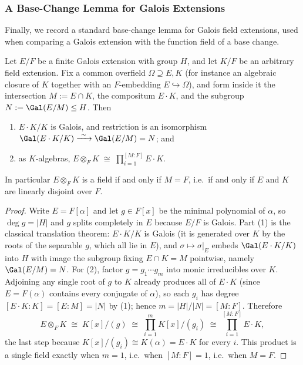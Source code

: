 \subsubsection*{A Base-Change Lemma for Galois Extensions}

Finally, we record a standard base-change lemma for Galois field extensions, used when
comparing a Galois extension with the function field of a base change.

\begin{lemma}\label{lem:galois-base-change}
Let $E/F$ be a finite Galois extension with group $H$, and let $K/F$ be an arbitrary
field extension. Fix a common overfield $\Omega \supseteq E,K$ (for instance an algebraic
closure of $K$ together with an $F$-embedding $E \hookrightarrow \Omega$), and form inside
it the intersection $M := E \cap K$, the compositum $E\cdot K$, and the subgroup
$N := \Gal(E/M) \leq H$. Then
\begin{enumerate}
  \item $E\cdot K / K$ is Galois, and restriction is an isomorphism
        $\Gal(E\cdot K/K) \xrightarrow{\ \sim\ } \Gal(E/M) = N$; and
  \item as $K$-algebras,
        $\displaystyle E \otimes_F K \;\cong\; \prod_{i=1}^{[M:F]} E\cdot K$.
\end{enumerate}
In particular $E\otimes_F K$ is a field if and only if $M = F$, i.e.\ if and only if $E$ and
$K$ are linearly disjoint over $F$.
\end{lemma}

\begin{proof}
Write $E = F[\alpha]$ and let $g \in F[x]$ be the minimal polynomial of $\alpha$, so
$\deg g = |H|$ and $g$ splits completely in $E$ because $E/F$ is Galois. Part (1) is the
classical translation theorem: $E\cdot K/K$ is Galois (it is generated over $K$ by the
roots of the separable $g$, which all lie in $E$), and $\sigma \mapsto \sigma|_E$ embeds
$\Gal(E\cdot K/K)$ into $H$ with image the subgroup fixing $E\cap K = M$ pointwise, namely
$\Gal(E/M) = N$. For (2), factor $g = g_1 \cdots g_m$ into monic irreducibles over $K$.
Adjoining any single root of $g$ to $K$ already produces all of $E\cdot K$ (since
$E = F(\alpha)$ contains every conjugate of $\alpha$), so each $g_i$ has degree
$[E\cdot K : K] = [E:M] = |N|$ by (1); hence $m = |H|/|N| = [M:F]$. Therefore
\[
E \otimes_F K \;\cong\; K[x]/(g) \;\cong\; \prod_{i=1}^{m} K[x]/(g_i)
\;\cong\; \prod_{i=1}^{[M:F]} E\cdot K ,
\]
the last step because $K[x]/(g_i) \cong K(\alpha) = E\cdot K$ for every $i$. This product is
a single field exactly when $m = 1$, i.e.\ when $[M:F] = 1$, i.e.\ when $M = F$.
\end{proof}
